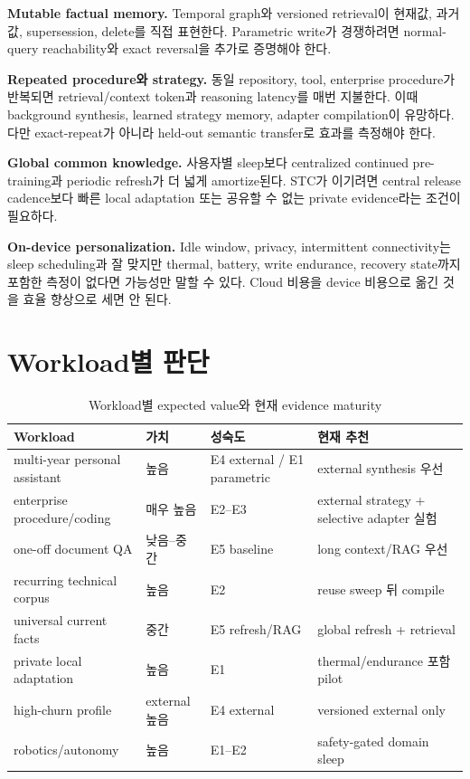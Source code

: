 \textbf{Mutable factual memory.} Temporal graph와 versioned retrieval이 현재값, 과거값, supersession,
delete를 직접 표현한다. Parametric write가 경쟁하려면 normal-query reachability와 exact reversal을
추가로 증명해야 한다.

\textbf{Repeated procedure와 strategy.} 동일 repository, tool, enterprise procedure가 반복되면
retrieval/context token과 reasoning latency를 매번 지불한다. 이때 background synthesis, learned
strategy memory, adapter compilation이 유망하다. 다만 exact-repeat가 아니라 held-out semantic transfer로
효과를 측정해야 한다.\autocite{srcstc0043,srcstc0054}

\textbf{Global common knowledge.} 사용자별 sleep보다 centralized continued pre-training과 periodic
refresh가 더 넓게 amortize된다. STC가 이기려면 central release cadence보다 빠른 local adaptation 또는
공유할 수 없는 private evidence라는 조건이 필요하다.

\textbf{On-device personalization.} Idle window, privacy, intermittent connectivity는 sleep scheduling과
잘 맞지만 thermal, battery, write endurance, recovery state까지 포함한 측정이 없다면 가능성만 말할 수
있다. Cloud 비용을 device 비용으로 옮긴 것을 효율 향상으로 세면 안 된다.

\section{Workload별 판단}

\begin{table}[htbp]
\centering
\caption{Workload별 expected value와 현재 evidence maturity}
\label{tab:workload-promisingness}
\begin{tabularx}{\textwidth}{L{0.25\textwidth} C{0.14\textwidth} C{0.18\textwidth} Y}
\toprule
Workload & 가치 & 성숙도 & 현재 추천 \\
\midrule
multi-year personal assistant & 높음 & E4 external / E1 parametric & external synthesis 우선 \\
enterprise procedure/coding & 매우 높음 & E2--E3 & external strategy + selective adapter 실험 \\
one-off document QA & 낮음--중간 & E5 baseline & long context/RAG 우선 \\
recurring technical corpus & 높음 & E2 & reuse sweep 뒤 compile \\
universal current facts & 중간 & E5 refresh/RAG & global refresh + retrieval \\
private local adaptation & 높음 & E1 & thermal/endurance 포함 pilot \\
high-churn profile & external 높음 & E4 external & versioned external only \\
robotics/autonomy & 높음 & E1--E2 & safety-gated domain sleep \\
\bottomrule
\end{tabularx}
\end{table}

